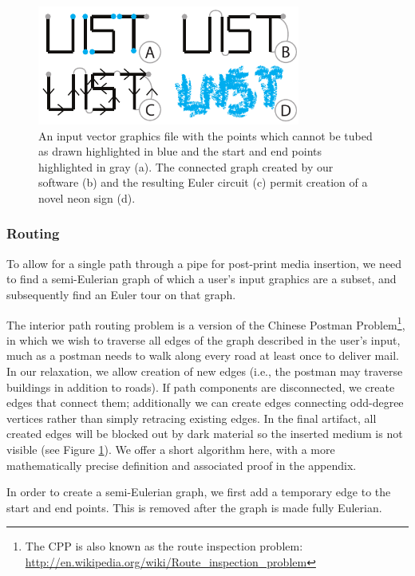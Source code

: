 \begin{figure}[h!]
\centering
    \includegraphics[width=3.4in]{figures/interior.pdf}
\caption{An input vector graphics file with the points which cannot be tubed as drawn highlighted in {\color{blue}blue} and the start and end points highlighted in {\color{gray}gray} (a).  The connected graph created by our software (b) and the resulting Euler circuit (c) permit creation of a novel neon sign (d).}
\label{fig:tool-process-interior}
\end{figure}

\subsubsection{Routing}
To allow for a single path through a pipe for post-print media insertion, we need to find a semi-Eulerian graph of which a user's input graphics are a subset, and subsequently find an Euler tour on that graph.

The interior path routing problem is a version of the Chinese Postman Problem\footnote{The CPP is also known as the route inspection problem: \url{http://en.wikipedia.org/wiki/Route_inspection_problem}}, in which we wish to traverse all edges of the graph described in the user's input, much as a postman needs to walk along every road at least once to deliver mail.  In our relaxation, we allow creation of new edges (i.e., the postman may traverse buildings in addition to roads).  If path components are disconnected, we create edges that connect them; additionally we can create edges connecting odd-degree vertices rather than simply retracing existing edges.  In the final artifact, all created edges will be blocked out by dark material so the inserted medium is not visible (see Figure \ref{fig:tool-process-interior}).  We offer a short algorithm here, with a more mathematically precise definition and associated proof in the appendix.

In order to create a semi-Eulerian graph, we first add a temporary edge to the start and end points.  This is removed after the graph is made fully Eulerian.

